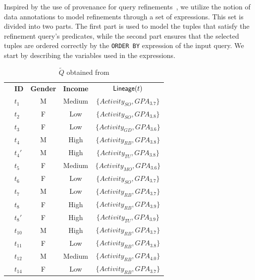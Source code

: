 Inspired by the use of provenance for query refinements~\cite{MLJ22,ERICA}, we utilize the notion of data annotations to model refinements through a set of expressions. This set is divided into two parts. The first part is used to model the tuples that satisfy the refinement query's predicates, while the second part ensures that the selected tuples are ordered correctly by the {\tt ORDER BY} expression of the input query. We start by describing the variables used in the expressions.



		

\begin{table}%
        \centering	
  \caption{$\widetilde{Q}$ obtained from \running{}}
  \hspace*{-1cm}
        \footnotesize
		\begin{tabular}{clccc}
		\cline{2-5}
		& \textbf{ID} & \textbf{Gender} & \textbf{Income} &  $\textsf{Lineage}(t)$ \\ \cline{2-5}
		 & $t_1$           & M               & Medium         & $\{Activity_{SO}, GPA_{3.7}\}$\\    
		 & $t_2$           & F               & Low         & $\{Activity_{SO}, GPA_{3.8}\}$\\    
		 & $t_3$           & F               & Low        & $\{Activity_{GD}, GPA_{3.6}\}$\\    
		& $t_4$            & M               & High     & $\{Activity_{RB}, GPA_{3.8}\}$\\
         & $t_4'$           & M               & High & $\{Activity_{TU}, GPA_{3.8}\}$\\
		 & $t_5$           & F               & Medium   & $\{Activity_{MO}, GPA_{3.6}\}$\\    
		& $t_6$            & F               & Low       & $\{Activity_{SO}, GPA_{3.7}\}$ \\    
		 & $t_7$           & M               & Low       & $\{Activity_{RB}, GPA_{3.7}\}$ \\    
		 & $t_8$           & F               & High      & $\{Activity_{RB}, GPA_{3.9}\}$\\
         & $t_{8}'$           & F               & High       & $\{Activity_{TU}, GPA_{3.9}\}$\\
		 & $t_{10}$           & M               & High  & $\{Activity_{RB}, GPA_{3.7}\}$\\    
		 & $t_{11}$           & F               & Low    & $\{Activity_{RB}, GPA_{3.8}\}$\\    
		 & $t_{12}$           & M               & Medium    & $\{Activity_{RB}, GPA_{4.0}\}$\\    
  	 &  $t_{14}$            & F               & Low       & $\{Activity_{RB}, GPA_{3.7}\}$\\ \cline{2-5} 
		\end{tabular}
  \label{tab:joined}
\end{table}

